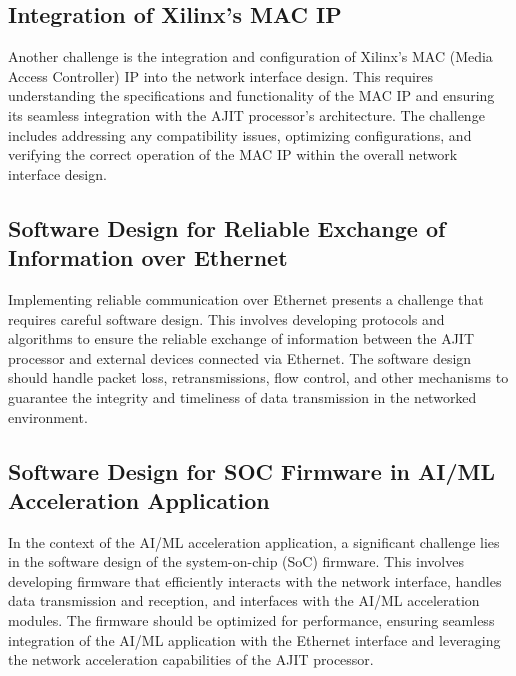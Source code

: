 \documentclass[a4paper,11pt, final]{report}
\begin{document}
		\subsection{Integration of Xilinx's MAC IP}
   Another challenge is the integration and configuration of Xilinx's MAC (Media Access Controller) IP into the network interface design. This requires understanding the specifications and functionality of the MAC IP and ensuring its seamless integration with the AJIT processor's architecture. The challenge includes addressing any compatibility issues, optimizing configurations, and verifying the correct operation of the MAC IP within the overall network interface design.\\

		\subsection{Software Design for Reliable Exchange of Information over Ethernet}
   Implementing reliable communication over Ethernet presents a challenge that requires careful software design. This involves developing protocols and algorithms to ensure the reliable exchange of information between the AJIT processor and external devices connected via Ethernet. The software design should handle packet loss, retransmissions, flow control, and other mechanisms to guarantee the integrity and timeliness of data transmission in the networked environment.\\

		\subsection{Software Design for SOC Firmware in AI/ML Acceleration Application}
   In the context of the AI/ML acceleration application, a significant challenge lies in the software design of the system-on-chip (SoC) firmware. This involves developing firmware that efficiently interacts with the network interface, handles data transmission and reception, and interfaces with the AI/ML acceleration modules. The firmware should be optimized for performance, ensuring seamless integration of the AI/ML application with the Ethernet interface and leveraging the network acceleration capabilities of the AJIT processor.\\



\end{document}
